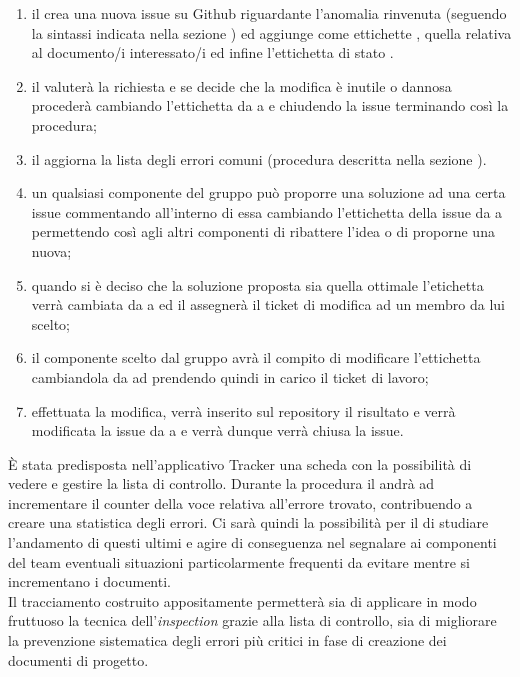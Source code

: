 				\begin{enumerate}
				    \item il  crea una nuova issue su Github riguardante l'anomalia rinvenuta (seguendo la sintassi indicata nella sezione ) ed aggiunge come ettichette , quella relativa al documento/i interessato/i ed infine l'ettichetta di stato .
				    \item il  valuterà la richiesta e se decide che la modifica è inutile o dannosa procederà cambiando l'ettichetta da  a  e chiudendo la issue terminando così la procedura;
				    \item il  aggiorna la lista degli errori comuni (procedura descritta nella sezione ).
				    \item un qualsiasi componente del gruppo può proporre una soluzione ad una certa issue commentando all'interno di essa cambiando l'ettichetta della issue da  a  permettendo così agli altri componenti di ribattere l'idea o di proporne una nuova;
				    \item quando si è deciso che la soluzione proposta sia quella ottimale l'etichetta verrà cambiata da  a  ed il  assegnerà il ticket di modifica ad un membro da lui scelto;
				    \item il componente scelto dal gruppo avrà il compito di modificare l'ettichetta cambiandola da  ad  prendendo quindi in carico il ticket di lavoro;
				    \item effettuata la modifica, verrà inserito sul repository il risultato e verrà modificata la issue da  a  e verrà dunque verrà chiusa la issue.
			\end{enumerate}
				\label{sec:tracciamento}
					È stata predisposta nell'applicativo Tracker una scheda con la possibilità di vedere e gestire la lista di controllo. Durante la procedura il  andrà ad incrementare il counter della voce relativa all'errore trovato, contribuendo a creare una statistica degli errori. Ci sarà quindi la possibilità per il  di studiare l'andamento di questi ultimi e agire di conseguenza nel segnalare ai componenti del team eventuali situazioni particolarmente frequenti da evitare mentre si incrementano i documenti.\\ Il tracciamento costruito appositamente permetterà sia di applicare in modo fruttuoso la tecnica dell'\textit{inspection} grazie alla lista di controllo, sia di migliorare la prevenzione sistematica degli errori più critici in fase di creazione dei documenti di progetto.
